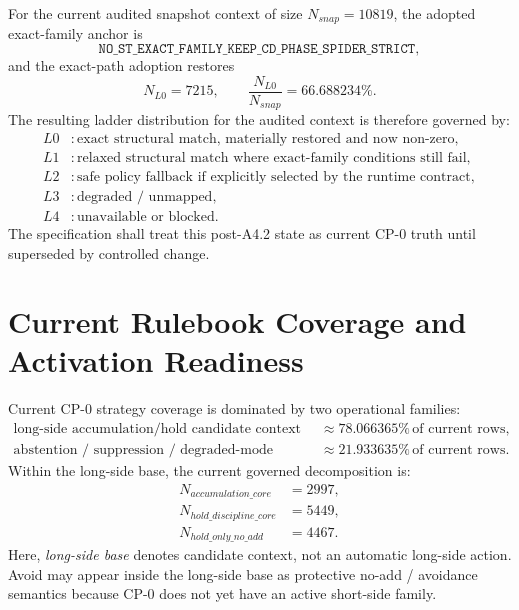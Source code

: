 For the current audited snapshot context of size $N_{snap}=10819$, the adopted exact-family anchor is
\[
\texttt{NO\_ST\_EXACT\_FAMILY\_KEEP\_CD\_PHASE\_SPIDER\_STRICT},
\]
and the exact-path adoption restores
\[
N_{L0}=7215,
\qquad
\frac{N_{L0}}{N_{snap}}=66.688234\%.
\]
The resulting ladder distribution for the audited context is therefore governed by:
\begin{align*}
L0 &: \text{exact structural match, materially restored and now non-zero},\\
L1 &: \text{relaxed structural match where exact-family conditions still fail},\\
L2 &: \text{safe policy fallback if explicitly selected by the runtime contract},\\
L3 &: \text{degraded / unmapped},\\
L4 &: \text{unavailable or blocked}.
\end{align*}
The specification shall treat this post-A4.2 state as current CP-0 truth until superseded by controlled change.

\section{Current Rulebook Coverage and Activation Readiness}

Current CP-0 strategy coverage is dominated by two operational families:
\begin{align*}
\text{long-side accumulation/hold candidate context} &\approx 78.066365\% \, \text{of current rows},\\
\text{abstention / suppression / degraded-mode handling} &\approx 21.933635\% \, \text{of current rows}.
\end{align*}
Within the long-side base, the current governed decomposition is:
\begin{align*}
N_{accumulation\_core} &= 2997,\\
N_{hold\_discipline\_core} &= 5449,\\
N_{hold\_only\_no\_add} &= 4467.
\end{align*}
Here, \emph{long-side base} denotes candidate context, not an automatic long-side action. Avoid may appear inside the long-side base as protective no-add / avoidance semantics because CP-0 does not yet have an active short-side family.

